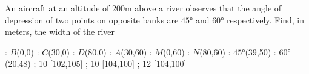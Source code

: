 
%
%
%
%
% 
% 

\question[2] An aircraft at an altitude of $200$m above a river observes that the angle 
of depression of two points on opposite banks are $\ang{45}$ and $\ang{60}$ respectively.
Find, in meters, the width of the river


\ifprintanswers
  \begin{marginfigure}
      : $B$(0,0)
      : $C$(30,0)
      : $D$(80,0)
      : $A$(30,60)
      : $M$(0,60)
      : $N$(80,60)
      : $\ang{45}$(39,50) %
      : $\ang{60}$(20,48)
    \figdrawbegin{}
      \figdrawline [100,103,102,101,100]
      \figdrawline [103,101]
      \figdrawline [104,105]
       ; 10 [102,105] 
       ; 10 [104,100] 
       ; 12 [104,100] 
    \figdrawend
    \centerline{\box\figBoxA}
  \end{marginfigure}
\fi 

